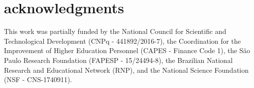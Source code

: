 \section*{acknowledgments}

This work was partially funded by the National Council for Scientific and Technological Development (CNPq - 441892/2016-7), the Coordination for the Improvement of Higher Education Personnel (CAPES - Finance Code 1), the São Paulo Research Foundation (FAPESP - 15/24494-8), the Brazilian National Research and Educational Network (RNP), and the National Science Foundation (NSF - CNS-1740911).